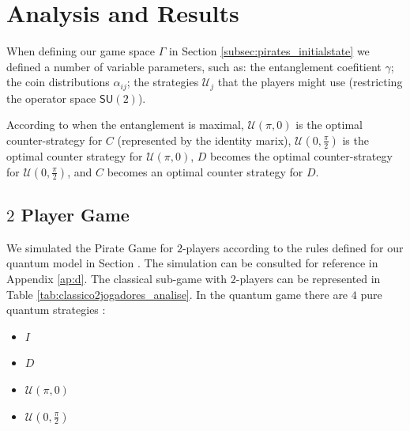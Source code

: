 \section{Analysis and Results}
\label{sec:description_3}

When defining our game space $\Gamma$ in Section \ref{subsec:pirates_initialstate} we defined a number of variable parameters, such as: the entanglement coefitient $\gamma$; the coin distributions $\alpha_{ij}$; the strategies $\mathcal{U}_{j}$ that the players might use (restricting the operator space $\mathsf{SU}(2)$). 

According to \cite{Du} when the entanglement is maximal, $\mathcal{U}(\pi, 0)$ is the optimal counter-strategy for $C$ (represented by the identity marix), $\mathcal{U}(0, \frac{\pi}{2})$ is the optimal counter strategy for $\mathcal{U}(\pi, 0)$, $D$ becomes the optimal counter-strategy for $\mathcal{U}(0, \frac{\pi}{2})$, and $C$ becomes an optimal counter strategy for $D$.

\subsection{$2$ Player Game}
\label{subsec:2playergame}

We simulated the Pirate Game for $2$-players according to the rules defined for our quantum model in Section . The simulation can be consulted for reference in Appendix \ref{ap:d}. The classical sub-game with $2$-players can be represented in Table \ref{tab:classico2jogadores_analise}. In the quantum game there are $4$ pure quantum strategies :

\begin{itemize}

\item $I$

\item $D$

\item $\mathcal{U}( \pi, 0)$

\item $\mathcal{U}( 0, \frac{\pi}{2})$

\end{itemize}

